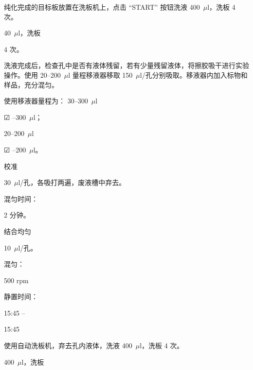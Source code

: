 \documentclass[UTF8,10pt,a4paper,fontset=fandol]{ctexart}
\newcommand{\fieldvalue}[1]{#1}
\newcommand{\handwritten}[1]{#1}
\newcommand{\checkboxfield}[1]{\ifstrequal{#1}{checked}{☑}{\ifstrequal{#1}{unclear}{?}{☐}}}
\begin{document}
纯化完成的目标板放置在洗板机上，点击 ``START'' 按钮洗液 400~$\mu$l，洗板 4 次。  

\fieldvalue{\handwritten{40}}~$\mu$l，洗板

\fieldvalue{\handwritten{4}} 次。

洗液完成后，检查孔中是否有液体残留，若有少量残留液体，将擦胶吸干进行实验操作。使用 20--200~$\mu$l 量程移液器移取 150~$\mu$l/孔分别吸取。移液器内加入标物和样品，充分混匀。

使用移液器量程为：
30--300~$\mu$l

\fieldvalue{\checkboxfield{checked}}
--300~$\mu$l；

20--200~$\mu$l

\fieldvalue{\checkboxfield{checked}}
--200~$\mu$l。

校准

\fieldvalue{\handwritten{30}}~$\mu$l/孔，各吸打两遍，废液槽中弃去。

混匀时间：

\fieldvalue{\handwritten{2}} 分钟。

结合均匀

\fieldvalue{\handwritten{10}}~$\mu$l/孔。

\begin{flushleft}
混匀：

\fieldvalue{\handwritten{500}} rpm

静置时间：

\fieldvalue{\handwritten{15:45}}
\quad -- \quad

\fieldvalue{\handwritten{15:45}}
\end{flushleft}

使用自动洗板机，弃去孔内液体，洗液 400~$\mu$l，洗板 4 次。

\fieldvalue{\handwritten{400}}~$\mu$l，洗板
\end{document}
